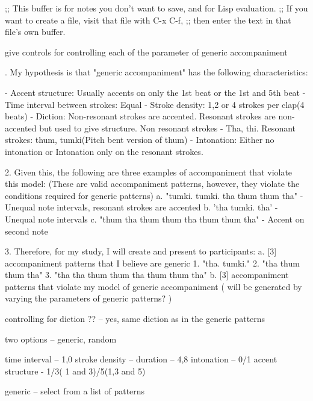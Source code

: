 ;; This buffer is for notes you don't want to save, and for Lisp evaluation.
;; If you want to create a file, visit that file with C-x C-f,
;; then enter the text in that file's own buffer.



give controls for controlling each of the parameter of generic accompaniment

. My hypothesis is that "generic accompaniment" has the following characteristics:

- Accent structure: Usually accents on only the 1st beat or the 1st and 5th beat
- Time interval between strokes: Equal
- Stroke density: 1,2 or 4 strokes per clap(4 beats)
- Diction: Non-resonant strokes are accented. Resonant strokes are non-accented but used to give structure. Non resonant strokes - Tha, thi. Resonant strokes: thum, tumki(Pitch bent version of thum)
- Intonation: Either no intonation or Intonation only on the resonant strokes.

2. Given this, the following are three examples of accompaniment that violate this model: (These are valid accompaniment patterns, however, they violate the conditions required for generic patterns)
a. "tumki. tumki. tha thum thum tha" - Unequal note intervals, resonant strokes are accented
b. 'tha tumki. tha' - Unequal note intervals
c. "thum tha thum thum tha thum thum tha" - Accent on second note

3. Therefore, for my study, I will create and present to participants:
a. [3] accompaniment patterns that I believe are generic
1. "tha. tumki."
2. "tha thum thum tha"
3. "tha tha thum thum tha thum thum tha"
b. [3] accompaniment patterns that violate my model of generic accompaniment ( will be generated by varying the parameters of generic patterns? )


controlling for diction ?? -- yes, same diction as in the generic patterns

two options -- generic, random

time interval -- 1,0
stroke density -- 
duration -- 4,8
intonation -- 0/1
accent structure - 1/3( 1 and 3)/5(1,3 and 5)

generic -- select from a list of patterns

